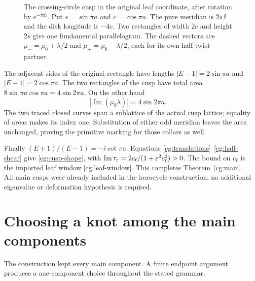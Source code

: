 \begin{figure}[ht]
\centering
\caption{The crossing-circle cusp in the original leaf coordinate,
after rotation by $e^{-\pi\ii a}$. Put $s=\sin\pi a$ and
$c=\cos\pi a$. The pure meridian is $2s\,\ii$ and the disk
longitude is $-4c$. Two rectangles of width $2c$ and height $2s$
give one fundamental parallelogram. The dashed vectors are
$\mu_-=\mu_0+\lambda/2$ and $\mu_+=\mu_0-\lambda/2$,
each for its own half-twist partner.}
\label{cg:fig-cusp}
\end{figure}

The adjacent sides of the original rectangle have lengths
$|E-1|=2\sin\pi a$ and $|E+1|=2\cos\pi a$.
The two rectangles of the cusp have total area
$8\sin\pi a\cos\pi a=4\sin2\pi a$. On the other hand
\begin{equation}\label{cg:lattice-area}
 \left|\operatorname{Im}(\overline{\mu_0}\lambda)\right|
       =4\sin2\pi a .
\end{equation}
The two traced closed curves span a sublattice of the actual cusp
lattice; equality of areas makes its index one. Substitution of
either odd meridian leaves the area unchanged, proving the
primitive marking for those collars as well.

Finally $(E+1)/(E-1)=-\ii\cot\pi a$.
Equations \eqref{cg:translations}--\eqref{cg:half-shear} give
\eqref{cg:cusp-shape}, with
$\operatorname{Im}\tau_\varepsilon=2c_\ell/(1+\varepsilon^2c_\ell^2)>0$.
The bound on $c_\ell$ is the imported leaf window
\eqref{cg:leaf-window}. This completes Theorem~\ref{cg:main}.
All main cusps were already included in the horocycle construction;
no additional eigenvalue or deformation hypothesis is required.

\section{Choosing a knot among the main components}
\label{cg:knot}

The construction kept every main component. A finite endpoint
argument produces a one-component choice throughout the stated
grammar.

